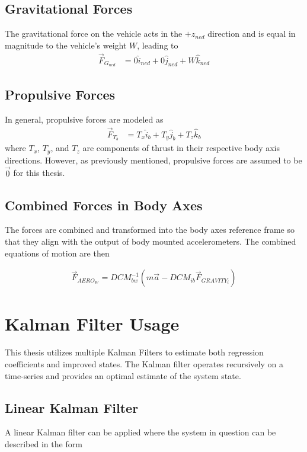 \subsection*{Gravitational Forces}
The gravitational force on the vehicle acts in the $+z_{ned}$ direction and is equal in magnitude to the vehicle's weight $W$, leading to
\begin{align}
\vec{F}_{G_{ned}} &= 0\hat{i}_{ned}+0\hat{j}_{ned}+W\hat{k}_{ned}
\end{align}

\subsection*{Propulsive Forces}
In general, propulsive forces are modeled as
\begin{align}
\vec{F}_{T_b} &= T_x \hat{i}_b+T_y \hat{j}_b +T_z \hat{k}_b
\end{align}
where $T_x$, $T_y$, and $T_z$ are components of thrust in their respective body axis directions. However, as previously mentioned, propulsive forces are assumed to be $\vec{0}$ for this thesis.

\subsection{Combined Forces in Body Axes}
The forces are combined and transformed into the body axes reference frame so that they align with the output of body mounted accelerometers. The combined equations of motion are then

\begin{align}
\vec{F}_{AERO_W} = DCM_{bw}^{-1}(m\vec{a} - DCM_{ib}\vec{F}_{GRAVITY_i})
\end{align}


\section{Kalman Filter Usage}
\label{kalman-filter}
This thesis utilizes multiple Kalman Filters to estimate both regression coefficients and improved states. The Kalman filter operates recursively on a time-series and provides an optimal estimate of the system state.

\subsection{Linear Kalman Filter}
A linear Kalman filter can be applied where the system in question can be described in the form \cite{welch1995introduction}

